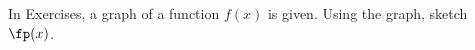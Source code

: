 \begin{exerciseset}{In Exercises}{, a graph of a function $f(x)$ is given. Using the graph, sketch $\fp(x)$.}


\end{exerciseset}
